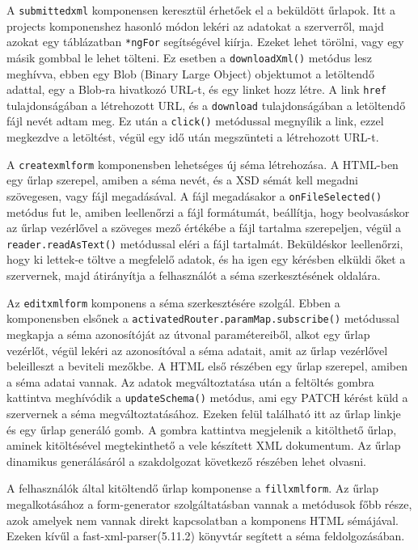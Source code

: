 A \texttt{submittedxml} komponensen keresztül érhetőek el a beküldött űrlapok. Itt a projects komponenshez hasonló módon lekéri az adatokat a szerverről, majd azokat egy táblázatban \texttt{*ngFor} segítségével kiírja. Ezeket lehet törölni, vagy egy másik gombbal le lehet tölteni. Ez esetben  a \texttt{downloadXml()} metódus lesz meghívva, ebben egy Blob (Binary Large Object) objektumot a letöltendő adattal, egy a Blob-ra hivatkozó URL-t, és egy linket hozz létre. A link \texttt{href} tulajdonságában a létrehozott URL, és a \texttt{download} tulajdonságában a letöltendő fájl nevét adtam meg. Ez után a \texttt{click()} metódussal megnyílik a link, ezzel megkezdve a letöltést, végül egy idő után megszünteti a létrehozott URL-t.

A \texttt{createxmlform} komponensben lehetséges új séma létrehozása. A HTML-ben egy űrlap szerepel, amiben a séma nevét, és a XSD sémát kell megadni szövegesen, vagy fájl megadásával. A fájl megadásakor a \texttt{onFileSelected()} metódus fut le, amiben leellenőrzi a fájl formátumát, beállítja, hogy beolvasáskor az űrlap vezérlővel a szöveges mező értékébe a fájl tartalma szerepeljen, végül a 
\texttt{reader.readAsText()} metódussal eléri a fájl tartalmát. Beküldéskor leellenőrzi, hogy ki lettek-e töltve a megfelelő adatok, és ha igen egy kérésben elküldi őket a szervernek, majd átirányítja a felhasználót a séma szerkesztésének oldalára.

Az \texttt{editxmlform} komponens a séma szerkesztésére szolgál. Ebben a komponensben elsőnek a \texttt{activatedRouter.paramMap.subscribe()} metódussal megkapja a séma azonosítóját az útvonal paramétereiből, alkot egy űrlap vezérlőt, végül lekéri az azonosítóval a séma adatait, amit az űrlap vezérlővel beleilleszt a beviteli mezőkbe. A HTML első részében egy űrlap szerepel, amiben a séma adatai vannak. Az adatok megváltoztatása után a feltöltés gombra kattintva meghívódik a \texttt{updateSchema()} metódus, ami egy PATCH kérést küld a szervernek a séma megváltoztatásához. Ezeken felül található itt az űrlap linkje és egy űrlap generáló gomb. A gombra kattintva megjelenik a kitölthető űrlap, aminek kitöltésével megtekinthető a vele készített XML dokumentum. Az űrlap dinamikus generálásáról a szakdolgozat következő részében lehet olvasni.


A felhasználók által kitöltendő űrlap komponense a \texttt{fillxmlform}. Az űrlap megalkotásához a form-generator szolgáltatásban vannak a metódusok főbb része, azok amelyek nem vannak direkt kapcsolatban a komponens HTML sémájával. Ezeken kívűl a fast-xml-parser(5.11.2) könyvtár segített a séma feldolgozásában.

